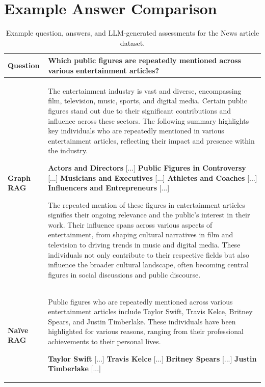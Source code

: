 \documentclass{article}
\begin{document}
\raggedbottom

\pagebreak
\section{Example Answer Comparison}
\label{app:question}

\begin{table}[h]
    \caption{Example question, answers, and LLM-generated assessments for the News article dataset.}
    \small
    \centering
    \def\arraystretch{1.25}%
    \begin{tabular}{>{\raggedright\arraybackslash}p{}>{\raggedright\arraybackslash}p{}} \hline 
 \textbf{Question} & \textbf{Which public figures are repeatedly mentioned across various entertainment articles?}\\ \hline 
 \textbf{Graph RAG} & The entertainment industry is vast and diverse, encompassing film, television, music, sports, and digital media. Certain public figures stand out due to their significant contributions and influence across these sectors. The following summary highlights key individuals who are repeatedly mentioned in various entertainment articles, reflecting their impact and presence within the industry.


\textbf{Actors and Directors} [...] \textbf{Public Figures in Controversy} [...]
 \textbf{Musicians and Executives} [...] \textbf{Athletes and Coaches} [...] \textbf{Influencers and Entrepreneurs} [...]

 
The repeated mention of these figures in entertainment articles signifies their ongoing relevance and the public's interest in their work. Their influence spans across various aspects of entertainment, from shaping cultural narratives in film and television to driving trends in music and digital media. These individuals not only contribute to their respective fields but also influence the broader cultural landscape, often becoming central figures in social discussions and public discourse.\vspace*{2mm}\\ \hline 
\textbf{Na\"ive RAG} & Public figures who are repeatedly mentioned across various entertainment articles include Taylor Swift, Travis Kelce, Britney Spears, and Justin Timberlake. These individuals have been highlighted for various reasons, ranging from their professional achievements to their personal lives.

\textbf{Taylor Swift} [...] \textbf{Travis Kelce} [...] \textbf{Britney Spears} [...] \textbf{Justin Timberlake}
[...]


\end{tabular}
\end{table}
\end{document}
